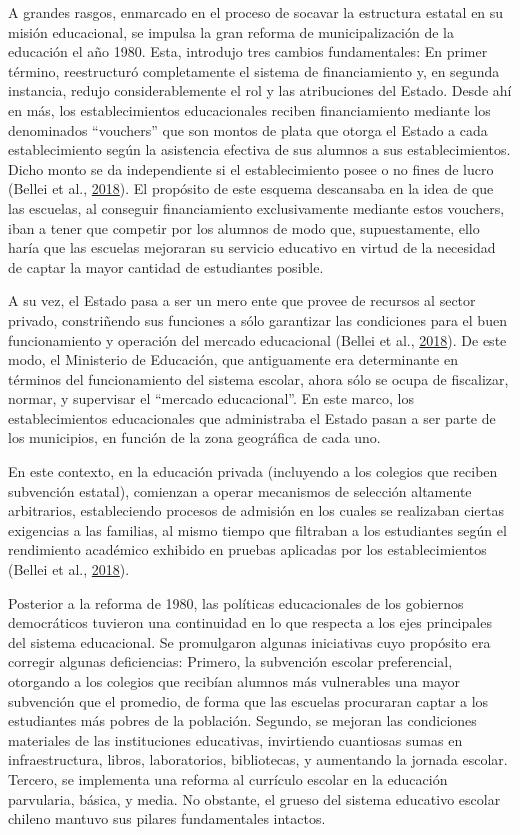 \documentclass[
]{article}
\begin{document}
A grandes rasgos, enmarcado en el proceso de socavar la estructura
estatal en su misión educacional, se impulsa la gran reforma de
municipalización de la educación el año 1980. Esta, introdujo tres
cambios fundamentales: En primer término, reestructuró completamente el
sistema de financiamiento y, en segunda instancia, redujo
considerablemente el rol y las atribuciones del Estado. Desde ahí en
más, los establecimientos educacionales reciben financiamiento mediante
los denominados ``vouchers'' que son montos de plata que otorga el
Estado a cada establecimiento según la asistencia efectiva de sus
alumnos a sus establecimientos. Dicho monto se da independiente si el
establecimiento posee o no fines de lucro (Bellei et al.,
\protect\hyperlink{ref-bellei_nueva_2018}{2018}). El propósito de este
esquema descansaba en la idea de que las escuelas, al conseguir
financiamiento exclusivamente mediante estos vouchers, iban a tener que
competir por los alumnos de modo que, supuestamente, ello haría que las
escuelas mejoraran su servicio educativo en virtud de la necesidad de
captar la mayor cantidad de estudiantes posible.

A su vez, el Estado pasa a ser un mero ente que provee de recursos al
sector privado, constriñendo sus funciones a sólo garantizar las
condiciones para el buen funcionamiento y operación del mercado
educacional (Bellei et al.,
\protect\hyperlink{ref-bellei_nueva_2018}{2018}). De este modo, el
Ministerio de Educación, que antiguamente era determinante en términos
del funcionamiento del sistema escolar, ahora sólo se ocupa de
fiscalizar, normar, y supervisar el ``mercado educacional''. En este
marco, los establecimientos educacionales que administraba el Estado
pasan a ser parte de los municipios, en función de la zona geográfica de
cada uno.

En este contexto, en la educación privada (incluyendo a los colegios que
reciben subvención estatal), comienzan a operar mecanismos de selección
altamente arbitrarios, estableciendo procesos de admisión en los cuales
se realizaban ciertas exigencias a las familias, al mismo tiempo que
filtraban a los estudiantes según el rendimiento académico exhibido en
pruebas aplicadas por los establecimientos (Bellei et al.,
\protect\hyperlink{ref-bellei_nueva_2018}{2018}).

Posterior a la reforma de 1980, las políticas educacionales de los
gobiernos democráticos tuvieron una continuidad en lo que respecta a los
ejes principales del sistema educacional. Se promulgaron algunas
iniciativas cuyo propósito era corregir algunas deficiencias: Primero,
la subvención escolar preferencial, otorgando a los colegios que
recibían alumnos más vulnerables una mayor subvención que el promedio,
de forma que las escuelas procuraran captar a los estudiantes más pobres
de la población. Segundo, se mejoran las condiciones materiales de las
instituciones educativas, invirtiendo cuantiosas sumas en
infraestructura, libros, laboratorios, bibliotecas, y aumentando la
jornada escolar. Tercero, se implementa una reforma al currículo escolar
en la educación parvularia, básica, y media. No obstante, el grueso del
sistema educativo escolar chileno mantuvo sus pilares fundamentales
intactos.
\end{document}
